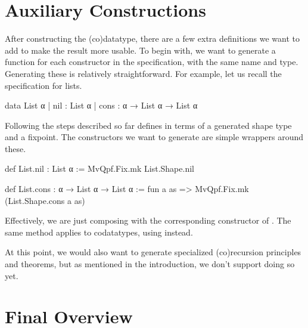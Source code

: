 \section{Auxiliary Constructions}%
\label{sec:aux_constructions}

After constructing the (co)datatype, there are a few extra definitions we want to add to make the result more usable. To begin with, we want to generate a function for each constructor 
in the specification, with the same name and type. Generating these is relatively straightforward.
For example, let us recall the specification for lists.
\begin{leancode}
  data List α
    | nil  : List α 
    | cons : α → List α → List α
\end{leancode}
Following the steps described so far defines  in terms of a generated shape type 
and a fixpoint. The constructors we want to generate are simple wrappers around these.
\begin{leancode}
  def List.nil : List α 
    := MvQpf.Fix.mk List.Shape.nil

  def List.cons : α → List α → List α 
    := fun a as => MvQpf.Fix.mk (List.Shape.cons a as)
\end{leancode}
Effectively, we are just composing  with the corresponding constructor of .
The same method applies to codatatypes, using  instead.

At this point, we would also want to generate specialized (co)recursion principles and 
theorems, but as mentioned in the introduction, we don't support doing so yet.


\section{Final Overview}%
\label{sec:procedure:overview}

